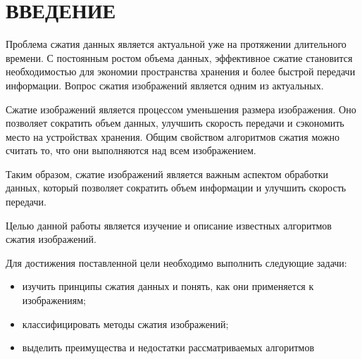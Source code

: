 \chapter*{ВВЕДЕНИЕ}

Проблема сжатия данных является актуальной уже на протяжении длительного времени.
С постоянным ростом объема данных, эффективное сжатие становится необходимостью для экономии пространства хранения и более быстрой передачи информации.
Вопрос сжатия изображений является одним из актуальных.

Сжатие изображений является процессом уменьшения размера изображения.
Оно позволяет сократить объем данных, улучшить скорость передачи и сэкономить место на устройствах хранения.
Общим свойством алгоритмов сжатия можно считать то, что они выполняются над всем изображением.\cite{adaptive_method_image_compression}

Таким образом, сжатие изображений является важным аспектом обработки данных, который позволяет сократить объем информации и улучшить скорость передачи.

Целью данной работы является изучение и описание известных алгоритмов сжатия изображений.

Для достижения поставленной цели необходимо выполнить следующие задачи:
\begin{itemize}
    \item изучить принципы сжатия данных и понять, как они применяется к изображениям;
    \item классифицировать методы сжатия изображений;
    \item выделить преимущества и недостатки рассматриваемых алгоритмов
\end{itemize}

